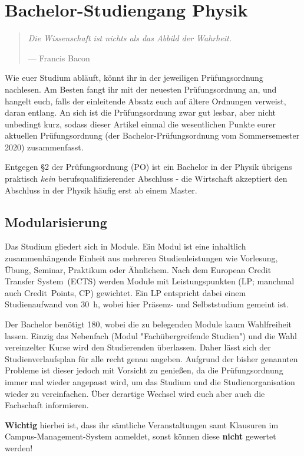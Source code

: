 \section[Bachelor-Studiengang Physik]{Bachelor-Studiengang Physik}
\begin{multicols}{2}
\begin{quote}
	\textit{Die Wissenschaft ist nichts als das Abbild der Wahrheit.}
	
	\hfill--- Francis Bacon
\end{quote}

Wie euer Studium abläuft, könnt ihr in der jeweiligen Prüfungsordnung nachlesen. Am Besten fangt ihr mit der neuesten Prüfungsordnung an, und hangelt euch, falls der einleitende Absatz euch auf ältere Ordnungen verweist, daran entlang. An sich ist die Prüfungsordnung zwar gut lesbar, aber nicht unbedingt kurz, sodass dieser Artikel einmal die wesentlichen Punkte eurer aktuellen Prüfungsordnung (der Bachelor-Prüfungsordnung vom Sommersemester 2020) zusammenfasst.

Entgegen §2 der Prüfungsordnung (PO) ist ein Bachelor in der Physik übrigens praktisch \emph{kein} berufsqualifizierender Abschluss - die Wirtschaft akzeptiert den Abschluss in der Physik häufig erst ab einem Master.

\subsection{Modularisierung}
Das Studium gliedert sich in Module.
Ein Modul ist eine inhaltlich zusammenhängende Einheit aus mehreren Studienleistungen wie Vorlesung, Übung, Seminar, Praktikum oder Ähnlichem.
Nach dem European Credit Transfer System~(ECTS) werden Module mit Leistungspunkten (LP; manchmal auch Credit~Points, CP) gewichtet.
Ein LP entspricht dabei einem Studienaufwand von \SI{30}{\hour}, wobei hier Präsenz- und Selbststudium gemeint ist.

Der Bachelor benötigt \SI{180}{\LP}, wobei die zu belegenden Module kaum Wahlfreiheit lassen.
Einzig das Nebenfach (Modul "Fachübergreifende Studien") und die Wahl vereinzelter Kurse wird den Studierenden überlassen.
Daher lässt sich der Studienverlaufsplan für alle recht genau angeben.
Aufgrund der bisher genannten Probleme ist dieser jedoch mit Vorsicht zu genießen, da die Prüfungsordnung immer mal wieder angepasst wird, um das Studium und die Studienorganisation wieder zu vereinfachen.
Über derartige Wechsel wird euch aber auch die Fachschaft informieren.

\textbf{Wichtig} hierbei ist, dass ihr sämtliche Veranstaltungen samt Klausuren im Campus-Management-System anmeldet, sonst können diese \textbf{nicht} gewertet werden!\\
\\


\end{multicols}
